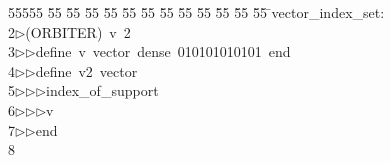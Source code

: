 %
%
\begin{tabbing}
55555 \= 55 \= 55 \= 55 \= 55 \= 55 \= 55 \= 55 \= 55 \= 55 \= 55 \= 55 \= 55 \= \>vector\_index\_set:\\[0pt]
2\>$\triangleright$\>(ORBITER)\ v\ 2\ \\[0pt]
3\>$\triangleright$\>$\triangleright$\>define\ v\ vector\ dense\ 010101010101\ end\ \\[0pt]
4\>$\triangleright$\>$\triangleright$\>define\ v2\ vector\ \\[0pt]
5\>$\triangleright$\>$\triangleright$\>$\triangleright$\>index\_of\_support\ \\[0pt]
6\>$\triangleright$\>$\triangleright$\>$\triangleright$\>v\ \\[0pt]
7\>$\triangleright$\>$\triangleright$\>end\ \\[0pt]
8\>\end{tabbing}
